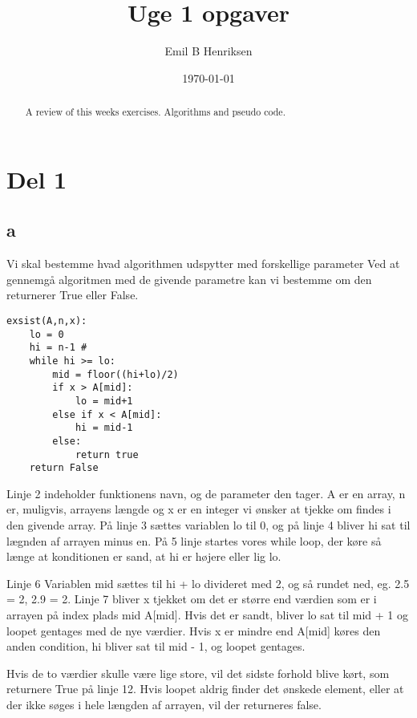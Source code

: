 \documentclass{report}
\begin{document}
\title{Uge 1 opgaver}
\author{Emil B Henriksen}
\date{\today}
\maketitle

\begin{abstract}
	A review of this weeks exercises. Algorithms and pseudo code.
\end{abstract}

\chapter{Del 1}
\section{a}
Vi skal bestemme hvad algorithmen udspytter med forskellige parameter\newline
Ved at gennemgå algoritmen med de givende parametre kan vi bestemme om den returnerer True eller False.

\lstset{language=Python}
\begin{linenumbers}
\begin{lstlisting}[frame=single]
exsist(A,n,x):
	lo = 0 
	hi = n-1 # 
	while hi >= lo:
		mid = floor((hi+lo)/2)
		if x > A[mid]:  
			lo = mid+1
		else if x < A[mid]:
			hi = mid-1
		else:
			return true
	return False
\end{lstlisting}
\end{linenumbers}

Linje 2 indeholder funktionens navn, og de parameter den tager. A er en array, n er, muligvis, arrayens længde og x er en integer vi ønsker at tjekke om findes i den givende array. På linje 3 sættes variablen lo til 0, og på linje 4 bliver hi sat til lægnden af arrayen minus en. På 5 linje startes vores while loop, der køre så længe at konditionen er sand, at hi er højere eller lig lo.
\newline

Linje 6 Variablen mid sættes til hi + lo divideret med 2, og så rundet ned, eg. 2.5 = 2, 2.9 = 2. Linje 7 bliver x tjekket om det er større end værdien som er i arrayen på index plads mid A[mid]. Hvis det er sandt, bliver lo sat til mid + 1 og loopet gentages med de nye værdier. Hvis x er mindre end A[mid] køres den anden condition, hi bliver sat til mid - 1, og loopet gentages.

Hvis de to værdier skulle være lige store, vil det sidste forhold blive kørt, som returnere True på linje 12. Hvis loopet aldrig finder det ønskede element, eller at der ikke søges i hele længden af arrayen, vil der returneres false.
\newline
\end{document}
